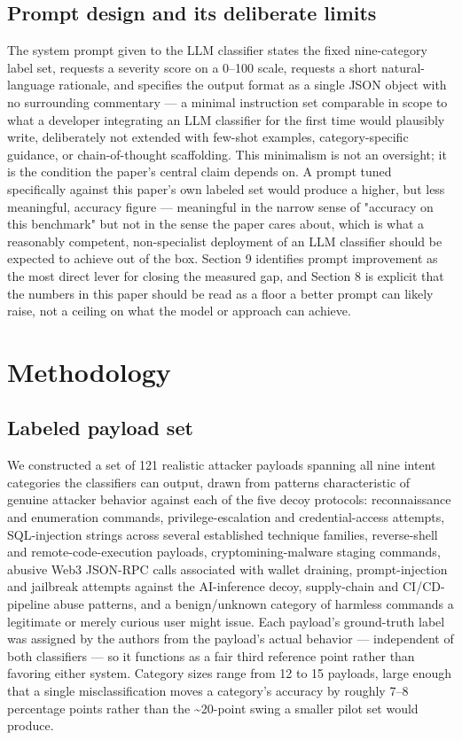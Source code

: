 \documentclass[journal,10pt,twocolumn]{IEEEtran}
\begin{document}
\subsection{Prompt design and its deliberate limits}

The system prompt given to the LLM classifier states the fixed nine-category label set, requests a severity score on a 0--100 scale, requests a short natural-language rationale, and specifies the output format as a single JSON object with no surrounding commentary --- a minimal instruction set comparable in scope to what a developer integrating an LLM classifier for the first time would plausibly write, deliberately not extended with few-shot examples, category-specific guidance, or chain-of-thought scaffolding. This minimalism is not an oversight; it is the condition the paper's central claim depends on. A prompt tuned specifically against this paper's own labeled set would produce a higher, but less meaningful, accuracy figure --- meaningful in the narrow sense of "accuracy on this benchmark" but not in the sense the paper cares about, which is what a reasonably competent, non-specialist deployment of an LLM classifier should be expected to achieve out of the box. Section 9 identifies prompt improvement as the most direct lever for closing the measured gap, and Section 8 is explicit that the numbers in this paper should be read as a floor a better prompt can likely raise, not a ceiling on what the model or approach can achieve.

\section{Methodology}

\subsection{Labeled payload set}

We constructed a set of 121 realistic attacker payloads spanning all nine intent categories the classifiers can output, drawn from patterns characteristic of genuine attacker behavior against each of the five decoy protocols: reconnaissance and enumeration commands, privilege-escalation and credential-access attempts, SQL-injection strings across several established technique families, reverse-shell and remote-code-execution payloads, cryptomining-malware staging commands, abusive Web3 JSON-RPC calls associated with wallet draining, prompt-injection and jailbreak attempts against the AI-inference decoy, supply-chain and CI/CD-pipeline abuse patterns, and a benign/unknown category of harmless commands a legitimate or merely curious user might issue. Each payload's ground-truth label was assigned by the authors from the payload's actual behavior --- independent of both classifiers --- so it functions as a fair third reference point rather than favoring either system. Category sizes range from 12 to 15 payloads, large enough that a single misclassification moves a category's accuracy by roughly 7--8 percentage points rather than the \textasciitilde{}20-point swing a smaller pilot set would produce.
\end{document}
